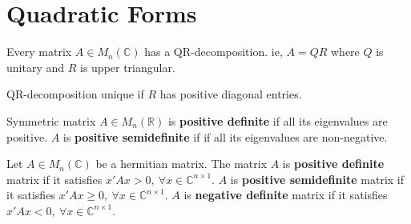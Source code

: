 \section{Quadratic Forms}
\begin{theorem}[QR decomposition]
	Every matrix $A \in M_n(\mathbb{C})$ has a QR-decomposition. ie, $A = QR$ where $Q$ is unitary and $R$ is upper triangular.
\end{theorem}
\begin{note}
	QR-decomposition unique if $R$ has positive diagonal entries.
\end{note}

\begin{definition}
	Symmetric matrix $A \in M_n(\mathbb{R})$ is \textbf{positive definite} if all its eigenvalues are positive.
	$A$ is \textbf{positive semidefinite} if if all its eigenvalues are non-negative.
\end{definition}

\begin{definition}
	Let $A \in M_n(\mathbb{C})$ be a hermitian matrix.
	The matrix $A$ is \textbf{positive definite} matrix if it satisfies $x'Ax > 0,\ \forall x \in \mathbb{C}^{n \times 1}$.
	$A$ is \textbf{positive semidefinite} matrix if it satisfies $x'Ax \ge  0,\ \forall x \in \mathbb{C}^{n \times 1}$.
	$A$ is \textbf{negative definite} matrix if it satisfies $x'Ax < 0,\ \forall x \in \mathbb{C}^{n \times 1}$.
\end{definition}
